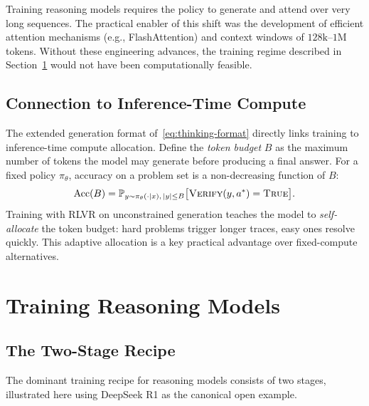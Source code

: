 \begin{remark}
Training reasoning models requires the policy to generate and attend
over very long sequences. The practical enabler of this shift was the
development of efficient attention mechanisms (e.g., FlashAttention)
and context windows of $128\text{k}$--$1\text{M}$ tokens. Without these
engineering advances, the training regime described in
Section~\ref{sec:training-reasoning} would not have been computationally
feasible.
\end{remark}

\subsection{Connection to Inference-Time Compute}
\label{subsec:cot-inference-compute}

The extended generation format of~\eqref{eq:thinking-format}
directly links training to inference-time compute allocation. Define
the \emph{token budget} $B$ as the maximum number
of tokens the model may generate before producing a final answer. For
a fixed policy $\pi_\theta$, accuracy on a problem set is a
non-decreasing function of $B$:
\[
\text{Acc}(B) = \mathbb{P}_{y \sim \pi_\theta(\cdot|x),\,|y| \le B}
               \bigl[\textsc{Verify}(y, a^*) = \textsc{True}\bigr].
\]
Training with RLVR on unconstrained generation teaches the model to
\emph{self-allocate} the token budget: hard problems trigger longer
traces, easy ones resolve quickly. This adaptive allocation is a
key practical advantage over fixed-compute alternatives.

\section{Training Reasoning Models}
\label{sec:training-reasoning}

\subsection{The Two-Stage Recipe}

The dominant training recipe for reasoning models consists of two
stages, illustrated here using DeepSeek R1 as the canonical open
example.

